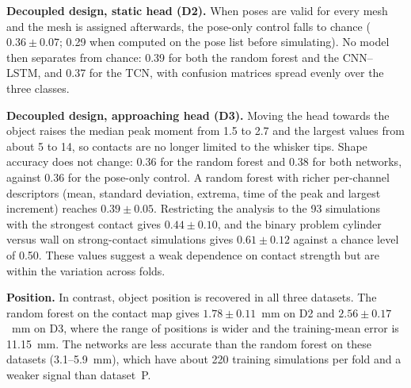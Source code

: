 \documentclass[conference]{IEEEtran}
\newcommand{\pmsd}[2]{$#1 \pm #2$}
\begin{document}
\textbf{Decoupled design, static head (D2).} When poses are valid for every mesh and the mesh is assigned afterwards, the pose-only control falls to chance (\pmsd{0.36}{0.07}; 0.29 when computed on the pose list before simulating). No model then separates from chance: 0.39 for both the random forest and the CNN--LSTM, and 0.37 for the TCN, with confusion matrices spread evenly over the three classes.

\textbf{Decoupled design, approaching head (D3).} Moving the head towards the object raises the median peak moment from 1.5 to 2.7 and the largest values from about 5 to 14, so contacts are no longer limited to the whisker tips. Shape accuracy does not change: 0.36 for the random forest and 0.38 for both networks, against 0.36 for the pose-only control. A random forest with richer per-channel descriptors (mean, standard deviation, extrema, time of the peak and largest increment) reaches \pmsd{0.39}{0.05}. Restricting the analysis to the 93 simulations with the strongest contact gives \pmsd{0.44}{0.10}, and the binary problem cylinder versus wall on strong-contact simulations gives \pmsd{0.61}{0.12} against a chance level of 0.50. These values suggest a weak dependence on contact strength but are within the variation across folds.

\textbf{Position.} In contrast, object position is recovered in all three datasets. The random forest on the contact map gives \pmsd{1.78}{0.11}~mm on D2 and \pmsd{2.56}{0.17}~mm on D3, where the range of positions is wider and the training-mean error is 11.15~mm. The networks are less accurate than the random forest on these datasets (3.1--5.9~mm), which have about 220 training simulations per fold and a weaker signal than dataset~P.
\end{document}
